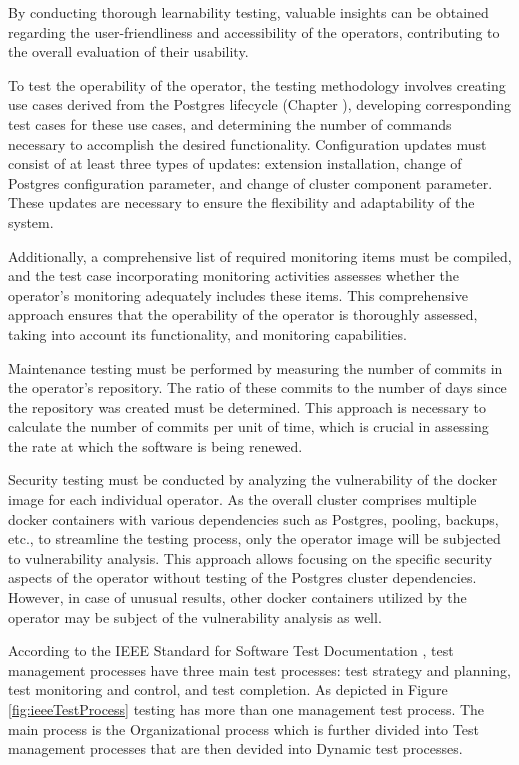 By conducting thorough learnability testing, valuable insights can be obtained regarding the user-friendliness and accessibility of the operators, contributing to the overall evaluation of their usability.

To test the operability of the operator, the testing methodology involves creating use cases derived from the Postgres lifecycle (Chapter ), developing corresponding test cases for these use cases, and determining the number of commands necessary to accomplish the desired functionality.
Configuration updates must consist of at least three types of updates: extension installation, change of Postgres configuration parameter, and change of cluster component parameter. These updates are necessary to ensure the flexibility and adaptability of the system.

Additionally, a comprehensive list of required monitoring items must be compiled, and the test case incorporating monitoring activities assesses whether the operator's monitoring adequately includes these items. This comprehensive approach ensures that the operability of the operator is thoroughly assessed, taking into account its functionality, and monitoring capabilities.

Maintenance testing must be performed by measuring the number of commits in the operator's repository. The ratio of these commits to the number of days since the repository was created must be determined. This approach is necessary to calculate the number of commits per unit of time, which is crucial in assessing the rate at which the software is being renewed.

Security testing must be conducted by analyzing the vulnerability of the docker image for each individual operator. As the overall cluster comprises multiple docker containers with various dependencies such as Postgres, pooling, backups, etc., to streamline the testing process, only the operator image will be subjected to vulnerability analysis. This approach allows focusing on the specific security aspects of the operator without testing of the Postgres cluster dependencies.
However, in case of unusual results, other docker containers utilized by the operator may be subject of the vulnerability analysis as well.

According to the IEEE Standard for Software Test Documentation \cite{ieeeTestProcess}, test management processes have three main test processes: test strategy and planning, test monitoring and control, and test completion.
As depicted in Figure \ref{fig:ieeeTestProcess} testing has more than one management test process. The main process is the Organizational process which is further divided into Test management processes that are then devided into Dynamic test processes.

